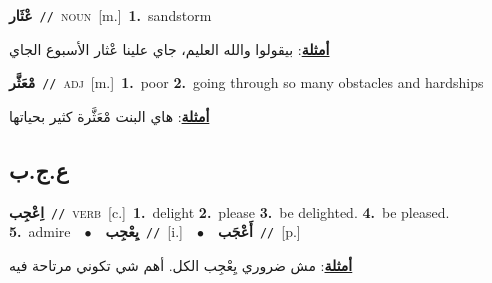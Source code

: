 \documentclass[10pt,a4paper,twoside]{article} %
\begin{document}
\begin{multicols}{2}
{{{{{{{{{{{{{\setlength\topsep{0pt}\textbf{\foreignlanguage{arabic}{عْثَار}}\ {\color{gray}\texttt{//}\color{black}}\ \textsc{noun}\ [m.]\ \textbf{1.}~sandstorm\  \begin{flushright}\color{gray}\foreignlanguage{arabic}{\textbf{\underline{\foreignlanguage{arabic}{أمثلة}}}: بيقولوا والله العليم، جاي علينا عْثار الأسبوع الجاي}\end{flushright}\color{black}} \vspace{2mm}

{\setlength\topsep{0pt}\textbf{\foreignlanguage{arabic}{مْعَثَّر}}\ {\color{gray}\texttt{//}\color{black}}\ \textsc{adj}\ [m.]\ \textbf{1.}~poor  \textbf{2.}~going through so many obstacles and hardships\  \begin{flushright}\color{gray}\foreignlanguage{arabic}{\textbf{\underline{\foreignlanguage{arabic}{أمثلة}}}: هاي البنت مْعَثَّرة كثير بحياتها}\end{flushright}\color{black}} \vspace{2mm}

\vspace{-3mm}
\subsection*{\color{blue}\foreignlanguage{arabic}{ع.ج.ب}\color{blue}{}} 

{\setlength\topsep{0pt}\textbf{\foreignlanguage{arabic}{اِعْجِب}}\ {\color{gray}\texttt{//}\color{black}}\ \textsc{verb}\ [c.]\ \textbf{1.}~delight  \textbf{2.}~please  \textbf{3.}~be delighted.  \textbf{4.}~be pleased.  \textbf{5.}~admire\ \ $\bullet$\ \ \setlength\topsep{0pt}\textbf{\foreignlanguage{arabic}{يِعْجِب}}\ {\color{gray}\texttt{//}\color{black}}\ [i.]\ \ $\bullet$\ \ \setlength\topsep{0pt}\textbf{\foreignlanguage{arabic}{أَعْجَب}}\ {\color{gray}\texttt{//}\color{black}}\ [p.]\  \begin{flushright}\color{gray}\foreignlanguage{arabic}{\textbf{\underline{\foreignlanguage{arabic}{أمثلة}}}: مش ضروري يِعْجِب الكل. أهم شي تكوني مرتاحة فيه}\end{flushright}\color{black}} \vspace{2mm}

}}}}}}}}}}}}
\end{multicols}
\end{document}

